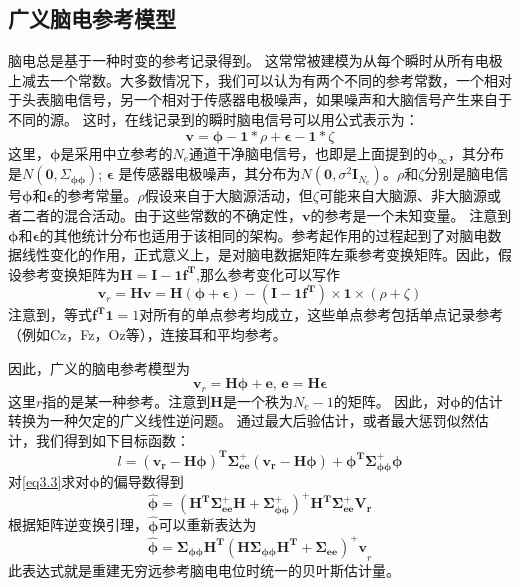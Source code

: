 \subsection{广义脑电参考模型}
脑电总是基于一种时变的参考记录得到。 这常常被建模为从每个瞬时从所有电极上减去一个常数。大多数情况下，我们可以认为有两个不同的参考常数，一个相对于头表脑电信号，另一个相对于传感器电极噪声，如果噪声和大脑信号产生来自于不同的源。 这时，在线记录到的瞬时脑电信号可以用公式表示为：
\begin{equation}\label{eq3.1}
\mathbf{v}=\mathbf{\phi}-\mathbf{1}*\rho+\mathbf{\epsilon}-\mathbf{1}*\zeta
\end{equation}
这里，$\mathbf{\phi}$是采用中立参考的$N_{e}$通道干净脑电信号，也即是上面提到的$\mathbf{\phi}_{\infty}$，其分布是$N(\mathbf{0},\Sigma_{\mathbf{\phi}\mathbf{\phi}})$; $\mathbf{\epsilon}$ 是传感器电极噪声，其分布为$N(\mathbf{0},\sigma^{2}\mathbf{I}_{N_{e}})$。$\rho$和$\zeta$分别是脑电信号$\mathbf{\phi}$和$\mathbf{\epsilon}$的参考常量。$\rho$假设来自于大脑源活动，但$\zeta$可能来自大脑源、非大脑源或者二者的混合活动。由于这些常数的不确定性，$\mathbf{v}$的参考是一个未知变量。 注意到$\mathbf{\phi}$和$\mathbf{\epsilon}$的其他统计分布也适用于该相同的架构。参考起作用的过程起到了对脑电数据线性变化的作用，正式意义上，是对脑电数据矩阵左乘参考变换矩阵。因此，假设参考变换矩阵为$\mathbf{H=I-1f^T}$,那么参考变化可以写作
\begin{equation*}
\mathbf{v}_{r}=\mathbf{Hv}=\mathbf{H(\phi+\epsilon)}-(\mathbf{I-1f^T})\times\mathbf{1}\times(\rho+\zeta)
\end{equation*}
注意到，等式$\mathbf{f^T1}=1$对所有的单点参考均成立，这些单点参考包括单点记录参考（例如Cz，Fz，Oz等），连接耳和平均参考。

因此，广义的脑电参考模型为
\begin{equation}\label{eq3.2}
\mathbf{v}_{r}=\mathbf{H\phi+e},\,\mathbf{e=H\epsilon}
\end{equation}
这里$r$指的是某一种参考。注意到$\mathbf{H}$是一个秩为$N_{e}-1$的矩阵。 因此，对$\mathbf{\phi}$的估计转换为一种欠定的广义线性逆问题。 通过最大后验估计，或者最大惩罚似然估计，我们得到如下目标函数：
\begin{equation}\label{eq3.3}
l=\mathbf{(v_{r}-H\phi)^{T}\Sigma_{ee}^{+}(v_{r}-H\phi)+\phi^{T}\Sigma_{\phi\phi}^{+}\phi}
\end{equation}
对\eqref{eq3.3}求对$\mathbf{\phi}$的偏导数得到
\begin{equation}
\hat{\mathbf{\phi}}=\mathbf{(H^T\Sigma_{ee}^{+}H+\Sigma_{\phi\phi}^{+})^{+}H^{T}\Sigma_{ee}^{+}V_{r}}
\end{equation}
根据矩阵逆变换引理，$\hat{\mathbf{\phi}}$可以重新表达为
\begin{equation}\label{eq3.4}
\hat{\mathbf{\phi}}=\mathbf{\Sigma_{\phi\phi}H^{T}(H\Sigma_{\phi\phi}H^{T}+\Sigma_{ee})^{+}v}_{r}
\end{equation}
此表达式就是重建无穷远参考脑电电位时统一的贝叶斯估计量。

